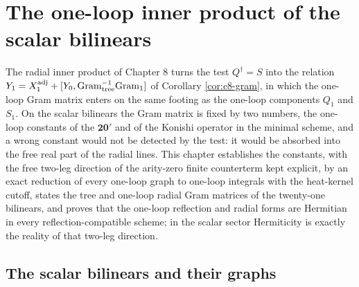 \chapter{The one-loop inner product of the scalar bilinears}

The radial inner product of Chapter 8 turns the test $Q^\dagger=S$ into the relation $Y_1=X_1^{\rm adj}+[Y_0,\mathrm{Gram}_{\rm tree}^{-1}\mathrm{Gram}_{\rm 1}]$ of Corollary \ref{cor:c8-gram}, in which the one-loop Gram matrix enters on the same footing as the one-loop components $Q_1$ and $S_1$. On the scalar bilinears the Gram matrix is fixed by two numbers, the one-loop constants of the $\mathbf{20'}$ and of the Konishi operator in the minimal scheme, and a wrong constant would not be detected by the test: it would be absorbed into the free real part of the radial lines. This chapter establishes the constants, with the free two-leg direction of the arity-zero finite counterterm kept explicit, by an exact reduction of every one-loop graph to one-loop integrals with the heat-kernel cutoff, states the tree and one-loop radial Gram matrices of the twenty-one bilinears, and proves that the one-loop reflection and radial forms are Hermitian in every reflection-compatible scheme; in the scalar sector Hermiticity is exactly the reality of that two-leg direction.

\section{The scalar bilinears and their graphs}

